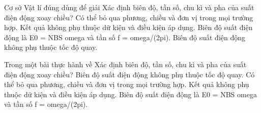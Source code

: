 \begin{ex}
Cơ sở Vật lí đúng dùng để giải Xác định biên độ, tần số, chu kì và pha của suất điện động xoay chiều?
\choice
{Có thể bỏ qua phương, chiều và đơn vị trong mọi trường hợp.}
{Kết quả không phụ thuộc dữ kiện và điều kiện áp dụng.}
{\True Biên độ suất điện động là E0 = NBS omega và tần số f = omega/(2pi).}
{Biên độ suất điện động không phụ thuộc tốc độ quay.}
\end{ex}

\begin{ex}
Trong một bài thực hành về Xác định biên độ, tần số, chu kì và pha của suất điện động xoay chiều?
\choice
{Biên độ suất điện động không phụ thuộc tốc độ quay.}
{Có thể bỏ qua phương, chiều và đơn vị trong mọi trường hợp.}
{Kết quả không phụ thuộc dữ kiện và điều kiện áp dụng.}
{\True Biên độ suất điện động là E0 = NBS omega và tần số f = omega/(2pi).}
\end{ex}

